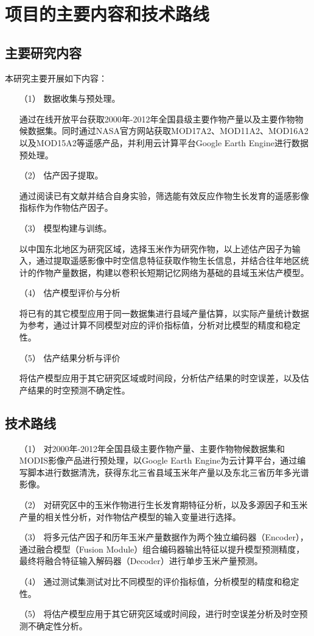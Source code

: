 \section{项目的主要内容和技术路线}

\subsection{主要研究内容}

\par 本研究主要开展如下内容：
\begin{itemize}
  \item [（1）] 数据收集与预处理。
  \par 通过在线开放平台获取2000年-2012年全国县级主要作物产量以及主要作物物候数据集。同时通过NASA官方网站获取MOD17A2、MOD11A2、MOD16A2以及MOD15A2等遥感产品，并利用云计算平台Google Earth Engine进行数据预处理。
  \item [（2）] 估产因子提取。
  \par 通过阅读已有文献并结合自身实验，筛选能有效反应作物生长发育的遥感影像指标作为作物估产因子。
  \item [（3）] 模型构建与训练。
  \par 以中国东北地区为研究区域，选择玉米作为研究作物，以上述估产因子为输入，通过提取遥感影像中时空信息特征获取作物生长信息，并结合往年地区统计的作物产量数据，构建以卷积长短期记忆网络为基础的县域玉米估产模型。
  \item [（4）] 估产模型评价与分析
  \par 将已有的其它模型应用于同一数据集进行县域产量估算，以实际产量统计数据为参考，通过计算不同模型对应的评价指标值，分析对比模型的精度和稳定性。
  \item [（5）] 估产结果分析与评价
  \par 将估产模型应用于其它研究区域或时间段，分析估产结果的时空误差，以及估产结果的时空预测不确定性。
\end{itemize}

\subsection{技术路线}
\begin{itemize}
  \item [（1）] 对2000年-2012年全国县级主要作物产量、主要作物物候数据集和MODIS影像产品进行预处理，以Google Earth Engine为云计算平台，通过编写脚本进行数据清洗，获得东北三省县域玉米年产量以及东北三省历年多光谱影像。
  \item [（2）] 对研究区中的玉米作物进行生长发育期特征分析，以及多源因子和玉米产量的相关性分析，对作物估产模型的输入变量进行选择。
  \item [（3）] 将多元估产因子和历年玉米产量数据作为两个独立编码器（Encoder），通过融合模型（Fusion Module）组合编码器输出特征以提升模型预测精度，最终将融合特征输入解码器（Decoder）进行单步玉米产量预测。
  \item [（4）] 通过测试集测试对比不同模型的评价指标值，分析模型的精度和稳定性。
  \item [（5）] 将估产模型应用于其它研究区域或时间段，进行时空误差分析及时空预测不确定性分析。
\end{itemize}

